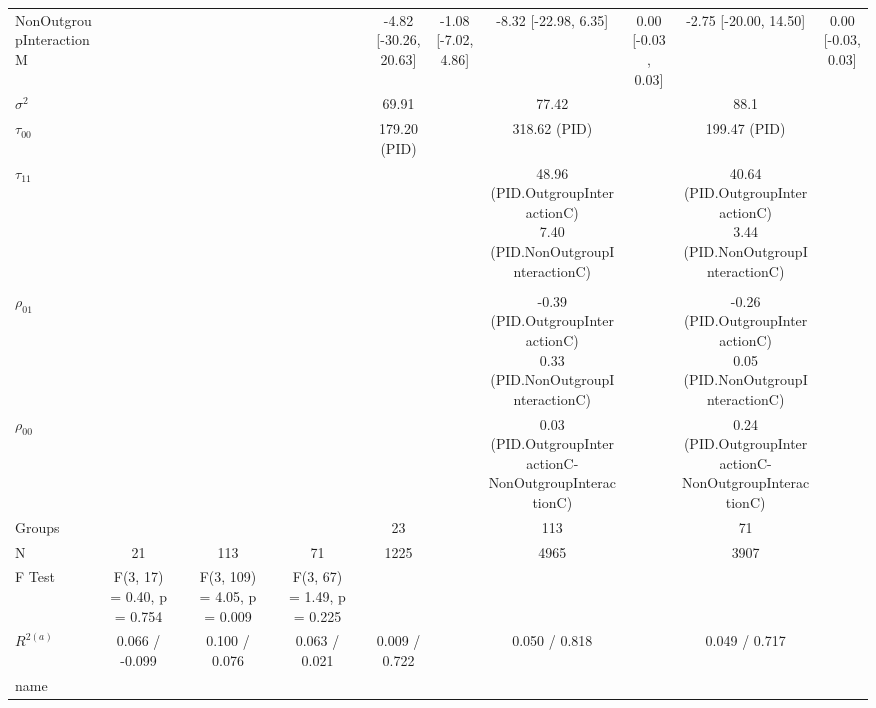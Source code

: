 \begin{landscape}
\begin{table}
\begin{minipage}[t][\textheight][t]{\textwidth}
{\begin{tabular}[t]{lcccccccccccc}
\hspace{1em}NonOutgroupInteractionM &  &  &  &  &  &  & -4.82 [-30.26, 20.63] & -1.08 [-7.02, 4.86] & -8.32 [-22.98,  6.35] & 0.00 [-0.03, 0.03] & -2.75 [-20.00, 14.50] & 0.00 [-0.03, 0.03]\\
\hspace{1em}$\sigma^2$ &  &  &  &  &  &  & 69.91 &  & 77.42 &  & 88.1 & \\
\hspace{1em}$\tau_{00}$ &  &  &  &  &  &  & 179.20 (PID) &  & 318.62 (PID) &  & 199.47 (PID) & \\
\hspace{1em}$\tau_{11}$ &  &  &  &  &  &  &  &  & \makecell[c]{48.96 (PID.OutgroupInteractionC)\\ 7.40 (PID.NonOutgroupInteractionC)} &  & \makecell[c]{40.64 (PID.OutgroupInteractionC)\\ 3.44 (PID.NonOutgroupInteractionC)} & \\
\addlinespace[0.3em]
\multicolumn{13}{l}{\textbf{Fit}}\\
\hspace{1em}$\rho_{01}$ &  &  &  &  &  &  &  &  & \makecell[c]{-0.39 (PID.OutgroupInteractionC)\\ 0.33 (PID.NonOutgroupInteractionC)} &  & \makecell[c]{-0.26 (PID.OutgroupInteractionC)\\ 0.05 (PID.NonOutgroupInteractionC)} & \\
\hspace{1em}$\rho_{00}$ &  &  &  &  &  &  &  &  & 0.03 (PID.OutgroupInteractionC-NonOutgroupInteractionC) &  & 0.24 (PID.OutgroupInteractionC-NonOutgroupInteractionC) & \\
\hspace{1em}Groups &  &  &  &  &  &  & 23 &  & 113 &  & 71 & \\
\hspace{1em}N & 21 &  & 113 &  & 71 &  & 1225 &  & 4965 &  & 3907 & \\
\hspace{1em}F Test & F(3, 17) = 0.40, p =  0.754 &  & F(3, 109) = 4.05, p =  0.009 &  & F(3, 67) = 1.49, p =  0.225 &  &  &  &  &  &  & \\
\hspace{1em}$R^{2 (a)}$ & 0.066 / -0.099 &  & 0.100 / 0.076 &  & 0.063 / 0.021 &  & 0.009 / 0.722 &  & 0.050 / 0.818 &  & 0.049 / 0.717 & \\
\hspace{1em}name &  &  &  &  &  &  &  &  &  &  &  & \\

\end{tabular}}
\end{minipage}
\end{table}
\end{landscape}
